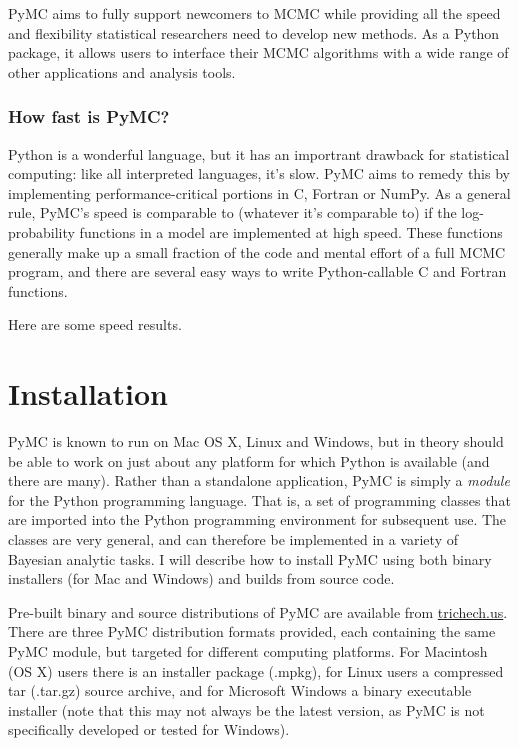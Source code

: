 \documentclass[]{book}
\begin{document}
PyMC aims to fully support newcomers to MCMC while providing all the speed and flexibility statistical researchers need to develop new methods. As a Python package, it allows users to interface their MCMC algorithms with a wide range of other applications and analysis tools.

\subsection{How fast is PyMC?}\label{speed} %
Python is a wonderful language, but it has an importrant drawback for statistical computing: like all interpreted languages, it's slow. PyMC aims to remedy this by implementing performance-critical portions in C, Fortran or NumPy. As a general rule, PyMC's speed is comparable to (whatever it's comparable to) if the log-probability functions in a model are implemented at high speed. These functions generally make up a small fraction of the code and mental effort of a full MCMC program, and there are several easy ways to write Python-callable C and Fortran functions.

Here are some speed results.


\chapter{Installation} %

PyMC is known to run on Mac OS X, Linux and Windows, but in theory should be able to work on just about any platform for which Python is available (and there are many). Rather than a standalone application, PyMC is simply a \emph{module} for the Python programming language. That is, a set of programming classes that are imported into the Python programming environment for subsequent use. The classes are very general, and can therefore be implemented in a variety of Bayesian analytic tasks. I will describe how to install PyMC using both binary installers (for Mac and Windows) and builds from source code.

Pre-built binary and source distributions of PyMC are available from \href{http://trichech.us}{trichech.us}. There are three PyMC distribution formats provided, each containing the same PyMC module, but targeted for different computing platforms. For Macintosh (OS X) users there is an installer package (.mpkg), for Linux users a compressed tar (.tar.gz) source archive, and for Microsoft Windows a binary executable installer (note that this may not always be the latest version, as PyMC is not specifically developed or tested for Windows).
\end{document}
